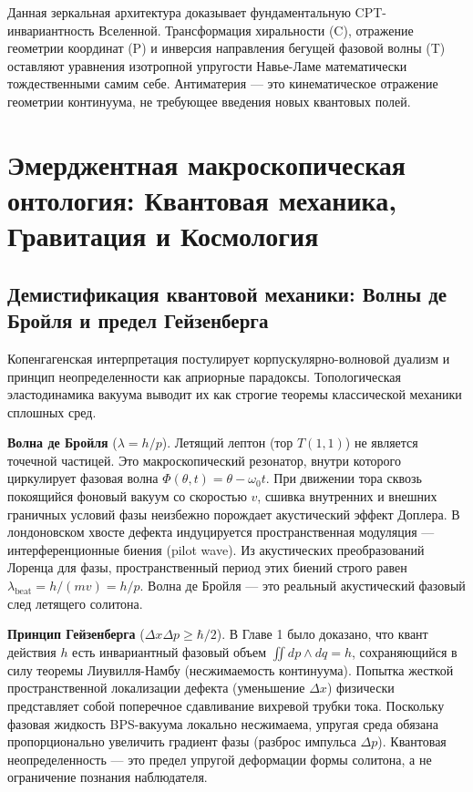 \documentclass[11pt,a4paper]{article}
\begin{document}
Данная зеркальная архитектура доказывает фундаментальную CPT-инвариантность Вселенной. Трансформация хиральности (C), отражение геометрии координат (P) и инверсия направления бегущей фазовой волны (T) оставляют уравнения изотропной упругости Навье-Ламе математически тождественными самим себе. Антиматерия — это кинематическое отражение геометрии континуума, не требующее введения новых квантовых полей.

\section{Эмерджентная макроскопическая онтология: Квантовая механика, Гравитация и Космология}

\subsection{Демистификация квантовой механики: Волны де Бройля и предел Гейзенберга}
Копенгагенская интерпретация постулирует корпускулярно-волновой дуализм и принцип неопределенности как априорные парадоксы. Топологическая эластодинамика вакуума выводит их как строгие теоремы классической механики сплошных сред.

\textbf{Волна де Бройля} ($\lambda = h/p$). Летящий лептон (тор $T(1,1)$) не является точечной частицей. Это макроскопический резонатор, внутри которого циркулирует фазовая волна $\Phi(\theta, t) = \theta - \omega_0 t$. При движении тора сквозь покоящийся фоновый вакуум со скоростью $v$, сшивка внутренних и внешних граничных условий фазы неизбежно порождает акустический эффект Доплера. В лондоновском хвосте дефекта индуцируется пространственная модуляция — интерференционные биения (pilot wave). Из акустических преобразований Лоренца для фазы, пространственный период этих биений строго равен $\lambda_{\text{beat}} = h / (mv) = h/p$. Волна де Бройля — это реальный акустический фазовый след летящего солитона.

\textbf{Принцип Гейзенберга} ($\Delta x \Delta p \ge \hbar/2$). В Главе 1 было доказано, что квант действия $h$ есть инвариантный фазовый объем $\iint dp \wedge dq = h$, сохраняющийся в силу теоремы Лиувилля-Намбу (несжимаемость континуума). Попытка жесткой пространственной локализации дефекта (уменьшение $\Delta x$) физически представляет собой поперечное сдавливание вихревой трубки тока. Поскольку фазовая жидкость BPS-вакуума локально несжимаема, упругая среда обязана пропорционально увеличить градиент фазы (разброс импульса $\Delta p$). Квантовая неопределенность — это предел упругой деформации формы солитона, а не ограничение познания наблюдателя.
\end{document}

